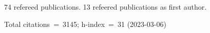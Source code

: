 74 refereed publications. 13 refeered publications as first author.

Total citations~=~3145; h-index~=~31 (2023-03-06)